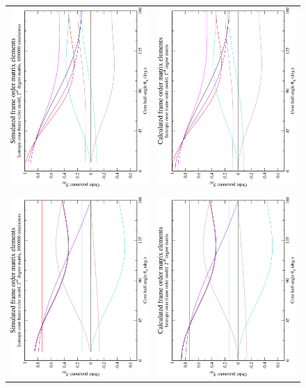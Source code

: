 \begin{figure}
\centering
  \begin{tabular}{@{}cc@{}}
    \includegraphics[width=.35\textwidth,angle=270]{images/frame_order_matrix/Sijkl_iso_cone_in_frame_theta_x_ens1000000.eps} &
    \includegraphics[width=.35\textwidth,angle=270]{images/frame_order_matrix/Sijkl_iso_cone_in_frame_theta_x_calc.eps} \\
    \\[-5pt]
    \includegraphics[width=.35\textwidth,angle=270]{images/frame_order_matrix/Sijkl_iso_cone_in_frame_theta_z_ens1000000.eps} &
    \includegraphics[width=.35\textwidth,angle=270]{images/frame_order_matrix/Sijkl_iso_cone_in_frame_theta_z_calc.eps} \\

\end{tabular}
\end{figure}
